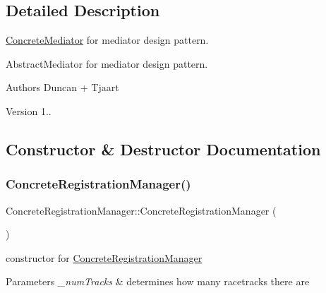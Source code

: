 \subsection{Detailed Description}
\mbox{\hyperlink{class_concrete_mediator}{Concrete\+Mediator}} for mediator design pattern. 

Abstract\+Mediator for mediator design pattern.

\begin{DoxyAuthor}{Authors}
Duncan + Tjaart 
\end{DoxyAuthor}
\begin{DoxyVersion}{Version}
1.. 
\end{DoxyVersion}


\subsection{Constructor \& Destructor Documentation}
\mbox{\label{class_concrete_registration_manager_a14de4a7f39a166d72e179549d99ddb9b}} 
\subsubsection{\texorpdfstring{Concrete\+Registration\+Manager()}{ConcreteRegistrationManager()}}
{\footnotesize\ttfamily Concrete\+Registration\+Manager\+::\+Concrete\+Registration\+Manager (\begin{DoxyParamCaption}{ }\end{DoxyParamCaption})}

constructor for \mbox{\hyperlink{class_concrete_registration_manager}{Concrete\+Registration\+Manager}} 
\begin{DoxyParams}{Parameters}
{\em \+\_\+num\+Tracks} & determines how many racetracks there are \\
\hline
\end{DoxyParams}
\mbox{\label{class_concrete_registration_manager_af27dd222a03c0d4c0dda6eea53b195e0}} 
